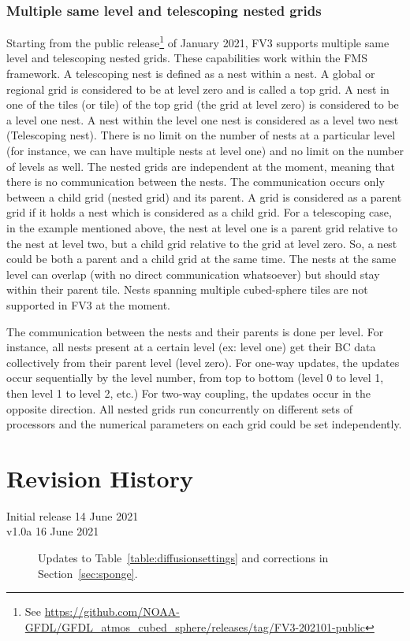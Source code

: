 \documentclass[10pt,letterpaper,margin=1in]{memoir}
\begin{document}
\subsection{Multiple same level and telescoping nested grids}
Starting from the public release\footnote{See \href{https://github.com/NOAA-GFDL/GFDL_atmos_cubed_sphere/releases/tag/FV3-202101-public}{https://github.com/NOAA-GFDL/GFDL_atmos_cubed_sphere/releases/tag/FV3-202101-public}} of January 2021, FV3 supports multiple same level and telescoping nested grids. These capabilities work within the FMS framework. A telescoping nest is defined as a nest within a nest. A global or regional grid is considered to be at level zero and is called a top grid. A nest in one of the tiles (or tile) of the top grid (the grid at level zero) is considered to be a level one nest. A nest within the level one nest is considered as a level two nest (Telescoping nest). There is no limit on the number of nests at a particular level (for instance, we can have multiple nests at level one) and no limit on the number of levels as well. The nested grids are independent at the moment, meaning that there is no communication between the nests. The communication occurs only between a child grid (nested grid) and its parent. A grid is considered as a parent grid if it holds a nest which is considered as a child grid. For a telescoping case, in the example mentioned above, the nest at level one is a parent grid relative to the nest at level two, but a child grid relative to the grid at level zero. So, a nest could be both a parent and a child grid at the same time. The nests at the same level can overlap (with no direct communication whatsoever) but should stay within their parent tile. Nests spanning multiple cubed-sphere tiles are not supported in FV3 at the moment. 

The communication between the nests and their parents is done per level. For instance, all nests present at a certain level (ex: level one) get their BC data collectively from their parent level (level zero). For one-way updates, the updates occur sequentially by the level number, from top to bottom (level 0 to level 1, then level 1 to level 2, etc.) For two-way coupling, the updates occur in the opposite direction. All nested grids run concurrently on different sets of processors and the numerical parameters on each grid could be set independently.




\chapter*{Revision History}

\begin{description}
\item[Initial release 14 June 2021] 
\item[v1.0a 16 June 2021] Updates to Table~\ref{table:diffusionsettings} and corrections in Section~\ref{sec:sponge}.
\end{description}
\end{document}
